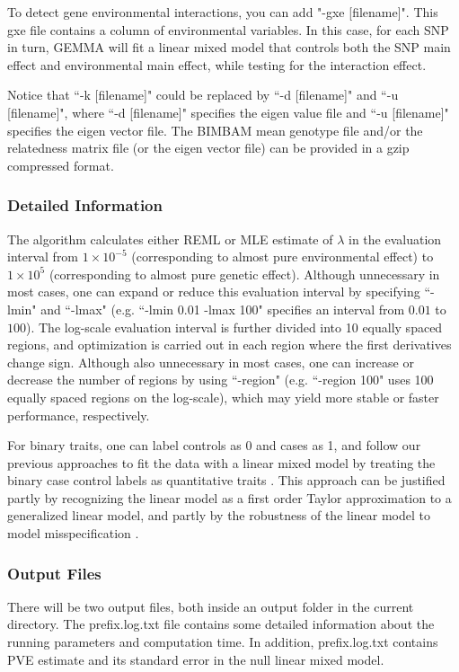 \documentclass[11pt]{article}
\begin{document}
To detect gene environmental interactions, you can add "-gxe [filename]". This gxe file contains a column of environmental variables. In this case, for each SNP in turn, GEMMA will fit a linear mixed model that controls both the SNP main effect and environmental main effect, while testing for the interaction effect. 

Notice that ``-k [filename]" could be replaced by ``-d [filename]" and ``-u [filename]", where ``-d [filename]" specifies the eigen value file and ``-u [filename]" specifies the eigen vector file. The BIMBAM mean genotype file and/or the relatedness matrix file (or the eigen vector file) can be provided in a gzip compressed format.

\subsubsection{Detailed Information}
The algorithm calculates either REML or MLE estimate of $\lambda$ in the evaluation interval from $1\times 10^{-5}$ (corresponding to almost pure environmental effect) to $1\times 10^5$ (corresponding to almost pure genetic effect). Although unnecessary in most cases, one can expand or reduce this evaluation interval by specifying ``-lmin" and ``-lmax" (e.g. ``-lmin 0.01 -lmax 100" specifies an interval from $0.01$ to $100$). The log-scale evaluation interval is further divided into 10 equally spaced regions, and optimization is carried out in each region where the first derivatives change sign. Although also unnecessary in most cases, one can increase or decrease the number of regions by using ``-region" (e.g. ``-region 100" uses 100 equally spaced regions on the log-scale), which may yield more stable or faster performance, respectively.

For binary traits, one can label controls as 0 and cases as 1, and follow our previous approaches to fit the data with a linear mixed model by treating the binary case control labels as quantitative traits \cite{Zhou:2012, Zhou:2013}. This approach can be justified partly by recognizing the linear model as a first order Taylor approximation to a generalized linear model, and partly by the robustness of the linear model to model misspecification \cite{Zhou:2013}.


\subsubsection{Output Files}
There will be two output files, both inside an output folder in the current directory. The prefix.log.txt file contains some detailed information about the running parameters and computation time. In addition, prefix.log.txt contains PVE estimate and its standard error in the null linear mixed model.
\end{document}
